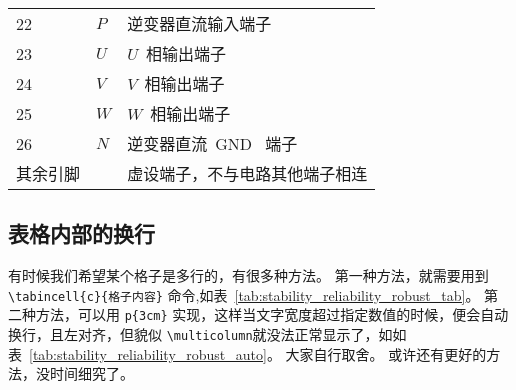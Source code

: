 \documentclass[../Main/thesis.tex]{subfiles}
\begin{document}
\begin{table}[ht]
\begin{tabular}{C{3.6cm}L{1.8cm}L{7.2cm}}
    22            & $P$           & 逆变器直流输入端子             \\
    23            & $U$           & $U$~相输出端子                 \\
    24            & $V$           & $V$~相输出端子                 \\
    25            & $W$           & $W$~相输出端子                 \\
    26            & $N$           & 逆变器直流~GND~ 端子           \\
    其余引脚      &               & 虚设端子，不与电路其他端子相连 \\
    \bottomrule
  \end{tabular}
\end{table}

\subsection{表格内部的换行}
有时候我们希望某个格子是多行的，有很多种方法。
第一种方法，就需要用到 \verb|\tabincell{c}{格子内容}| 命令,如表~\ref{tab:stability_reliability_robust_tab}。
第二种方法，可以用 \verb|p{3cm}| 实现，这样当文字宽度超过指定数值的时候，便会自动换行，且左对齐，但貌似 \verb|\multicolumn|就没法正常显示了，如如表~\ref{tab:stability_reliability_robust_auto}。
大家自行取舍。
或许还有更好的方法，没时间细究了。
\end{document}
